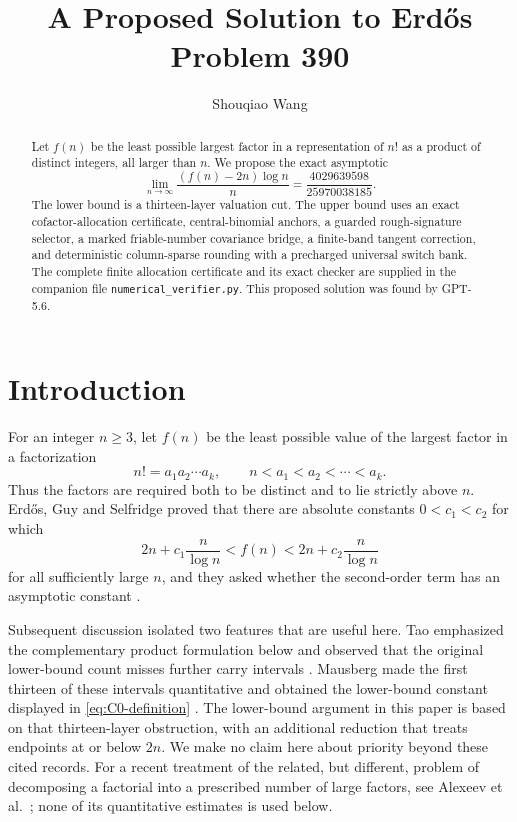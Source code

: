 \documentclass[11pt]{article}
\title{A Proposed Solution to Erd\H{o}s Problem 390}
\author{Shouqiao Wang}
\affil{Columbia University\hspace{2.5em}Multiscalar Intelligence}
\date{}
\numberwithin{equation}{section}
\theoremstyle{definition}
\theoremstyle{remark}
\newcommand{\1}{\mathbf 1}
\begin{document}
\allowdisplaybreaks
\maketitle

\begin{abstract}
Let \(f(n)\) be the least possible largest factor in a representation of
\(n!\) as a product of distinct integers, all larger than \(n\).  We
propose the exact asymptotic
\[
 \lim_{n\to\infty}\frac{(f(n)-2n)\log n}{n}
 =\frac{4029639598}{25970038185}.
\]
The lower bound is a thirteen-layer valuation cut.  The upper bound uses an
exact cofactor-allocation certificate, central-binomial anchors, a guarded
rough-signature selector, a marked friable-number covariance bridge, a
finite-band tangent correction, and deterministic column-sparse rounding
with a precharged universal switch bank.
The complete finite allocation certificate and its exact checker are
supplied in the companion file \texttt{numerical\_verifier.py}.
This proposed solution was found by GPT-5.6.
\end{abstract}

\tableofcontents

\section{Introduction}
\label{sec:introduction}

For an integer \(n\geq3\), let \(f(n)\) be the least possible value of
the largest factor in a factorization
\[
        n!=a_1a_2\cdots a_k,
        \qquad n<a_1<a_2<\cdots<a_k.
\]
Thus the factors are required both to be distinct and to lie strictly above
\(n\).  Erd\H{o}s, Guy and Selfridge proved that there are absolute constants
\(0<c_1<c_2\) for which
\[
  2n+c_1\frac{n}{\log n}<f(n)<
  2n+c_2\frac{n}{\log n}
\]
for all sufficiently large \(n\), and they asked whether the second-order
term has an asymptotic constant \cite[Theorem~3]{ErdosGuySelfridge1982}.

Subsequent discussion isolated two features that are useful here.  Tao
emphasized the complementary product formulation below and observed that
the original lower-bound count misses further carry intervals
\cite{Tao390Comment}.  Mausberg made the first thirteen of these intervals
quantitative and obtained the lower-bound constant displayed in
\eqref{eq:C0-definition} \cite{Mausberg2026}.  The lower-bound argument in
this paper is based on that thirteen-layer obstruction, with an additional
reduction that treats endpoints at or below \(2n\).  We make no claim here
about priority beyond these cited records.
For a recent treatment of the related, but different, problem of
decomposing a factorial into a prescribed number of large factors, see
Alexeev et al.\ \cite{AlexeevEtAl2026}; none of its quantitative estimates
is used below.
\end{document}
